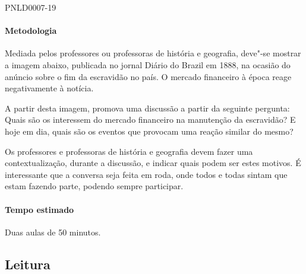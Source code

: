 \documentclass[11pt]{extarticle}
\begin{document}
 {PNLD0007-19}

\paragraph{Metodologia}

  Mediada pelos professores ou professoras de história e geografia, deve"-se mostrar a imagem abaixo,
  publicada no jornal Diário do Brazil em 1888, na ocasião do anúncio sobre o fim da escravidão no país.
  O mercado financeiro à época reage negativamente à notícia.
 

  A partir desta imagem, promova uma discussão a partir da seguinte pergunta: Quais são
  os interessem do mercado financeiro na manutenção da escravidão? E hoje em dia,
  quais são os eventos que provocam uma reação similar do mesmo?  

  Os professores e professoras de história e geografia devem fazer uma contextualização,
  durante a discussão, e indicar quais podem ser estes motivos. É interessante que a conversa
  seja feita em roda, onde todos e todas sintam que estam fazendo parte, podendo
  sempre participar.

  \paragraph{Tempo estimado} Duas aulas de 50 minutos.




\subsection{Leitura}
\end{document}
